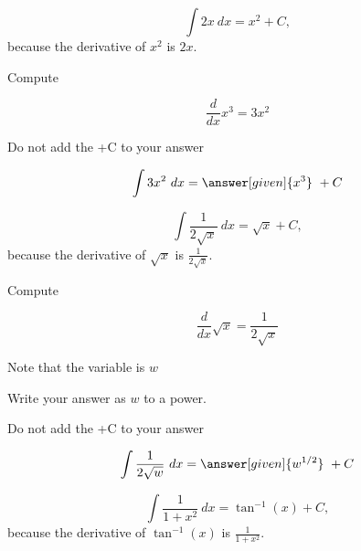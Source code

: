 \documentclass{ximera}
\begin{document}
\begin{example} %
\[
\int 2x \ dx = x^2 + C,
\]
because the derivative of $x^2$ is $2x$.

\end{example}


\begin{problem} %
Compute 

\begin{hint}
\[
\frac{d}{dx} x^3 = 3x^2
\]
\end{hint}
\begin{hint}
\begin{center}
Do not add the +C to your answer
\end{center}
\end{hint}

\[
\int 3x^2 \ dx =
\answer[given]{x^3} \ + C
\]
\end{problem}


\begin{example} %
\[
\int \frac{1}{2\sqrt x} \ dx = \sqrt x + C,
\]
because the derivative of $\sqrt x$ is $\frac{1}{2\sqrt x}$.

\end{example}



\begin{problem} %
Compute 

\begin{hint}
\[
\frac{d}{dx} \sqrt x = \frac{1}{2\sqrt x}
\]
\end{hint}
\begin{hint}
Note that the variable is $w$
\end{hint}
\begin{hint}
Write your answer as $w$ to a power.
\end{hint}
\begin{hint}
\begin{center}
Do not add the +C to your answer
\end{center}
\end{hint}

\[
\int \frac{1}{2\sqrt w} \ dx =
\answer[given]{w^{1/2}} \ + C
\]
\end{problem}



\begin{example} %
\[
\int \frac{1}{1 + x^2} \ dx = \tan^{-1}(x) + C,
\]
because the derivative 
of $\tan^{-1}(x)$ is $\frac{1}{1 + x^2}$.

\end{example}
\end{document}
